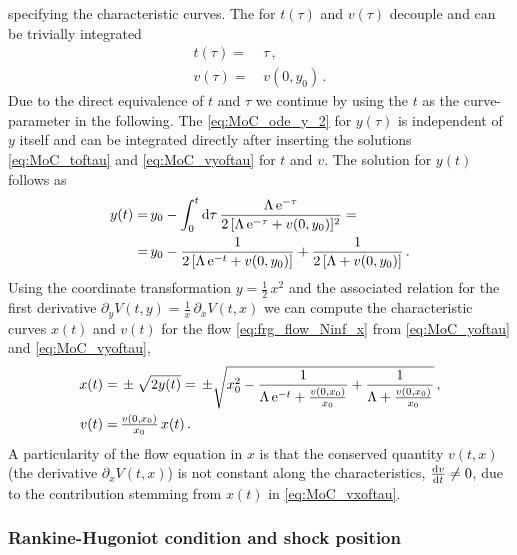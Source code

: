 specifying the characteristic curves. The \odes{} for $t(\tau)$ and $v(\tau)$ decouple and can be trivially integrated 
\begin{align}
	t ( \tau )= \, & \tau \, ,		\label{eq:MoC_toftau}
	\\
	v ( \tau ) = \, & v ( 0, y_0 ) \, .		\label{eq:MoC_vyoftau}
\end{align}
Due to the direct equivalence of $t$ and $\tau$ we continue by using the \rgtime{} $t$ as the curve-parameter in the following. The \ode{} \eqref{eq:MoC_ode_y_2} for $y(\tau)$ is independent of $y$ itself and can be integrated directly after inserting the solutions \eqref{eq:MoC_toftau} and \eqref{eq:MoC_vyoftau} for $t$ and $v$. The solution for $y ( t )$ follows as
	\begin{subequations}\label{eq:MoC_yoftau}
	\begin{align}
		y ( t ) = \, & y_0 - \int_0^t \dif \tau \, \frac{\Lambda \, \eu^{- \tau}}{2 \, [ \Lambda \, \eu^{- \tau} + v ( 0, y_0 ) ]^2} =
		\\* %
		= \, & y_0 - \frac{1}{2 \, [ \Lambda \, \eu^{-t} + v ( 0, y_0 ) ]} + \frac{1}{2 \, [ \Lambda + v ( 0, y_0 ) ]} \, .	
	\end{align}
	\end{subequations}
Using the coordinate transformation ${y = \tfrac{1}{2} \, x^2}$ and the associated relation for the first derivative ${\partial_y V ( t, y ) = \tfrac{1}{x} \, \partial_x V ( t, x )}$ we can compute the characteristic curves $x ( t )$ and $v ( t )$ for the flow \cref{eq:frg_flow_Ninf_x} from \cref{eq:MoC_yoftau} and \eqref{eq:MoC_vyoftau},
	\begin{align}
		x ( t ) = \, & \pm \sqrt{2 y ( t )} =	\,\pm \sqrt{x_0^2 - \frac{1}{\Lambda \, \mathrm{e}^{- t} + \tfrac{v ( 0, x_0 )}{x_0}} + \frac{1}{\Lambda + \tfrac{v ( 0, x_0 )}{x_0}} } \, ,	\label{eq:MoC_xoftau}
		\\
		v ( t ) = \, & \tfrac{v ( 0, x_0 )}{x_0} \, x ( t ) \, .\label{eq:MoC_vxoftau}
	\end{align}
A particularity of the flow equation in $x$ is that the conserved quantity $v ( t, x )$ (the derivative $\partial_x V ( t, x )$) is not constant along the characteristics, $\tfrac{\dif v}{\dif t} \neq 0$, due to the contribution stemming from $x ( t )$ in \cref{eq:MoC_vxoftau}.	

\subsubsection{Rankine-Hugoniot condition and shock position}
\label{app:rankine-hugoniot_condition_and_shock_position}

